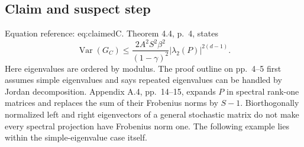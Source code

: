 \documentclass[10pt]{article}
\begin{document}
\subsection*{Claim and suspect step}
Equation reference: eq:claimedC. Theorem 4.4, p. 4, states \[
 \operatorname{Var}(G_C)\le
 \frac{2A^2S^2\beta^2}{(1-\gamma)^2}
 |\lambda_2(P)|^{2(d-1)}.\] Here eigenvalues are ordered by modulus. The proof outline on pp. 4–5 first assumes simple eigenvalues and says repeated eigenvalues can be handled by Jordan decomposition. Appendix A.4, pp. 14–15, expands \(P\) in spectral rank-one matrices and replaces the sum of their Frobenius norms by \(S-1\). Biorthogonally normalized left and right eigenvectors of a general stochastic matrix do not make every spectral projection have Frobenius norm one. The following example lies within the simple-eigenvalue case itself.\par
\end{document}
